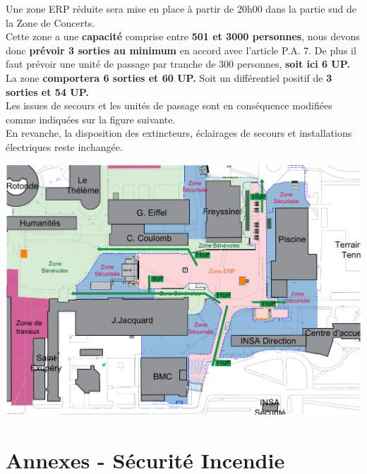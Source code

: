 \documentclass[hidelinks, paper=a4, fontsize=13pt]{report}
\begin{document}
Une zone ERP réduite sera mise en place à partir de 20h00 dans la partie sud de la Zone de Concerts.\\

Cette zone a une \textbf{capacité} comprise entre \textbf{501 et 3000 personnes}, nous devons donc \textbf{prévoir 3 sorties au minimum} en accord avec l’article P.A. 7. De plus il faut prévoir une unité de passage par tranche de 300 personnes, \textbf{soit ici 6 UP.}\\

La zone \textbf{comportera 6 sorties et 60 UP.} Soit un différentiel positif de \textbf{3 sorties et 54 UP.}\\
					
Les issues de secours et les unités de passage sont en conséquence modifiées comme indiquées sur la figure suivante.\\

En revanche, la disposition des extincteurs, éclairages de secours et installations électriques reste inchangée.\\

\begin{center}
\includegraphics[width=\textwidth,keepaspectratio, angle=90]{Exports/Plan_24h_45eme-Dimanche_IS}
\end{center}

\newpage

\section{Annexes - Sécurité Incendie}
\end{document}
